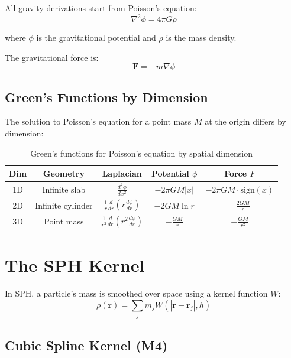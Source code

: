\documentclass[12pt]{article}
\begin{document}
All gravity derivations start from Poisson's equation:
\begin{equation}
\boxed{\nabla^2 \phi = 4\pi G \rho}
\end{equation}

where $\phi$ is the gravitational potential and $\rho$ is the mass density.

The gravitational force is:
\begin{equation}
\mathbf{F} = -m \nabla \phi
\end{equation}

\subsection{Green's Functions by Dimension}

The solution to Poisson's equation for a point mass $M$ at the origin differs by dimension:

\begin{table}[h]
\centering
\begin{tabular}{ccccc}
\toprule
\textbf{Dim} & \textbf{Geometry} & \textbf{Laplacian} & \textbf{Potential $\phi$} & \textbf{Force $F$} \\
\midrule
1D & Infinite slab & $\frac{d^2\phi}{dx^2}$ & $-2\pi G M |x|$ & $-2\pi GM \cdot \text{sign}(x)$ \\[4pt]
2D & Infinite cylinder & $\frac{1}{r}\frac{d}{dr}\left(r\frac{d\phi}{dr}\right)$ & $-2GM \ln r$ & $-\frac{2GM}{r}$ \\[4pt]
3D & Point mass & $\frac{1}{r^2}\frac{d}{dr}\left(r^2\frac{d\phi}{dr}\right)$ & $-\frac{GM}{r}$ & $-\frac{GM}{r^2}$ \\
\bottomrule
\end{tabular}
\caption{Green's functions for Poisson's equation by spatial dimension}
\end{table}

\section{The SPH Kernel}

In SPH, a particle's mass is smoothed over space using a kernel function $W$:
\begin{equation}
\rho(\mathbf{r}) = \sum_j m_j W(|\mathbf{r} - \mathbf{r}_j|, h)
\end{equation}

\subsection{Cubic Spline Kernel (M4)}
\end{document}
